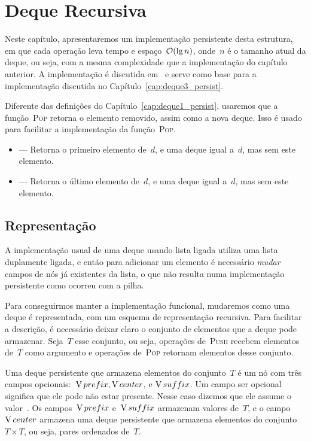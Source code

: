 \documentclass[main.tex]{subfiles}
\begin{document}
\chapter{Deque Recursiva} \label{cap:deque2_persist}

Neste capítulo, apresentaremos um implementação persistente desta estrutura, em que cada operação leva tempo e espaço~$\mathcal{O}(\lg n)$, onde~$n$ é o tamanho atual da deque, ou seja, com a mesma complexidade que a implementação do capítulo anterior. A implementação é discutida em~\cite{Kaplan2001} e serve como base para a implementação discutida no Capítulo~\ref{cap:deque3_persist}.

Diferente das definições do Capítulo~\ref{cap:deque1_persist}, usaremos que a função~\textsc{Pop} retorna o elemento removido, assim como a nova deque. Isso é usado para facilitar a implementação da função~\textsc{Pop}.
\begin{itemize}
	\item {} --- Retorna o primeiro elemento de~$d$, e uma deque igual a~$d$, mas sem este elemento.
	\item {} --- Retorna o último elemento de~$d$, e uma deque igual a~$d$, mas sem este elemento.
\end{itemize}

\section{Representação}

A implementação usual de uma deque usando lista ligada utiliza uma lista duplamente ligada, e então para adicionar um elemento é necessário \emph{mudar} campos de nós já existentes da lista, o que não resulta numa implementação persistente como ocorreu com a pilha.

Para conseguirmos manter a implementação funcional, mudaremos como uma deque é representada, com um esquema de representação recursiva. Para facilitar a descrição, é necessário deixar claro o conjunto de elementos que a deque pode armazenar. Seja~$T$ esse conjunto, ou seja, operações de~\textsc{Push} recebem elementos de~$T$ como argumento e operações de~\textsc{Pop} retornam elementos desse conjunto.

Uma deque persistente que armazena elementos do conjunto~$T$ é um nó com três campos opcionais:~$\operatorname{V}{prefix}, \operatorname{V}{center}$, e $\operatorname{V}{suffix}$. Um campo ser opcional significa que ele pode não estar presente. Nesse caso dizemos que ele assume o valor~. Os campos~$\operatorname{V}{prefix}$ e~$\operatorname{V}{suffix}$ armazenam valores de~$T$, e o campo~$\operatorname{V}{center}$ armazena uma deque persistente que armazena elementos do conjunto~$T \times T$, ou seja, pares ordenados de~$T$.
\end{document}
